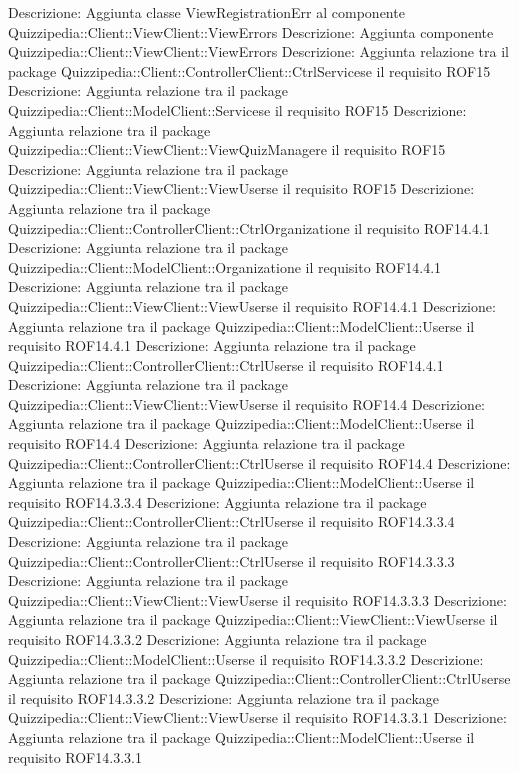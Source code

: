 Descrizione: Aggiunta classe ViewRegistrationErr al componente Quizzipedia::Client::ViewClient::ViewErrors 
Descrizione: Aggiunta componente Quizzipedia::Client::ViewClient::ViewErrors 
Descrizione: Aggiunta relazione tra il package Quizzipedia::Client::ControllerClient::CtrlServicese il requisito ROF15 
Descrizione: Aggiunta relazione tra il package Quizzipedia::Client::ModelClient::Servicese il requisito ROF15 
Descrizione: Aggiunta relazione tra il package Quizzipedia::Client::ViewClient::ViewQuizManagere il requisito ROF15 
Descrizione: Aggiunta relazione tra il package Quizzipedia::Client::ViewClient::ViewUserse il requisito ROF15 
Descrizione: Aggiunta relazione tra il package Quizzipedia::Client::ControllerClient::CtrlOrganizatione il requisito ROF14.4.1 
Descrizione: Aggiunta relazione tra il package Quizzipedia::Client::ModelClient::Organizatione il requisito ROF14.4.1 
Descrizione: Aggiunta relazione tra il package Quizzipedia::Client::ViewClient::ViewUserse il requisito ROF14.4.1 
Descrizione: Aggiunta relazione tra il package Quizzipedia::Client::ModelClient::Userse il requisito ROF14.4.1 
Descrizione: Aggiunta relazione tra il package Quizzipedia::Client::ControllerClient::CtrlUserse il requisito ROF14.4.1 
Descrizione: Aggiunta relazione tra il package Quizzipedia::Client::ViewClient::ViewUserse il requisito ROF14.4 
Descrizione: Aggiunta relazione tra il package Quizzipedia::Client::ModelClient::Userse il requisito ROF14.4 
Descrizione: Aggiunta relazione tra il package Quizzipedia::Client::ControllerClient::CtrlUserse il requisito ROF14.4 
Descrizione: Aggiunta relazione tra il package Quizzipedia::Client::ModelClient::Userse il requisito ROF14.3.3.4 
Descrizione: Aggiunta relazione tra il package Quizzipedia::Client::ControllerClient::CtrlUserse il requisito ROF14.3.3.4 
Descrizione: Aggiunta relazione tra il package Quizzipedia::Client::ControllerClient::CtrlUserse il requisito ROF14.3.3.3 
Descrizione: Aggiunta relazione tra il package Quizzipedia::Client::ViewClient::ViewUserse il requisito ROF14.3.3.3 
Descrizione: Aggiunta relazione tra il package Quizzipedia::Client::ViewClient::ViewUserse il requisito ROF14.3.3.2 
Descrizione: Aggiunta relazione tra il package Quizzipedia::Client::ModelClient::Userse il requisito ROF14.3.3.2 
Descrizione: Aggiunta relazione tra il package Quizzipedia::Client::ControllerClient::CtrlUserse il requisito ROF14.3.3.2 
Descrizione: Aggiunta relazione tra il package Quizzipedia::Client::ViewClient::ViewUserse il requisito ROF14.3.3.1 
Descrizione: Aggiunta relazione tra il package Quizzipedia::Client::ModelClient::Userse il requisito ROF14.3.3.1 
